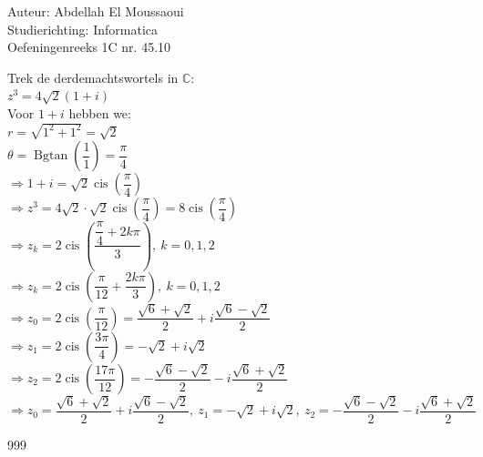\documentclass[a4paper]{article}
\begin{document}
  
\noindent \large Auteur: Abdellah El Moussaoui \\
\noindent \large Studierichting: Informatica\\
\noindent \large Oefeningenreeks 1C nr. 45.10\\

\medskip

\normalsize

\medskip

Trek de derdemachtswortels in $\mathbb{C}$:\\

$z^3=4\sqrt{2}(1+i)$\\

Voor $1+i$ hebben we:\\

$r=\sqrt{1^2+1^2}=\sqrt{2}$\\

$\theta=\operatorname{Bgtan}\left(\dfrac{1}{1}\right)=\dfrac{\pi}{4}$\\

$\Rightarrow 1+i=\sqrt{2}\operatorname{cis}\left(\dfrac{\pi}{4}\right)$\\

$\Rightarrow z^3=4\sqrt{2}\cdot \sqrt{2}\operatorname{cis}\left(\dfrac{\pi}{4}\right)=8\operatorname{cis}\left(\dfrac{\pi}{4}\right)$\\

$\Rightarrow z_k=2\operatorname{cis}\left(\dfrac{\dfrac{\pi}{4}+2k\pi}{3}\right),\ k=0,1,2$\\

$\Rightarrow z_k=2\operatorname{cis}\left(\dfrac{\pi}{12}+\dfrac{2k\pi}{3}\right),\ k=0,1,2$\\

$\Rightarrow z_0=2\operatorname{cis}\left(\dfrac{\pi}{12}\right)=\dfrac{\sqrt6+\sqrt{2}}{2}+i\dfrac{\sqrt6-\sqrt{2}}{2}$\\

$\Rightarrow z_1=2\operatorname{cis}\left(\dfrac{3\pi}{4}\right)=-\sqrt{2}+i\sqrt{2}$\\

$\Rightarrow z_2=2\operatorname{cis}\left(\dfrac{17\pi}{12}\right)=-\dfrac{\sqrt6-\sqrt{2}}{2}-i\dfrac{\sqrt6+\sqrt{2}}{2}$\\

$\Rightarrow \boxed{z_0=\dfrac{\sqrt6+\sqrt{2}}{2}+i\dfrac{\sqrt6-\sqrt{2}}{2},\ z_1=-\sqrt{2}+i\sqrt{2},\ z_2=-\dfrac{\sqrt6-\sqrt{2}}{2}-i\dfrac{\sqrt6+\sqrt{2}}{2}}$\\


\begin{thebibliography}{999}
\end{thebibliography}
\end{document}

